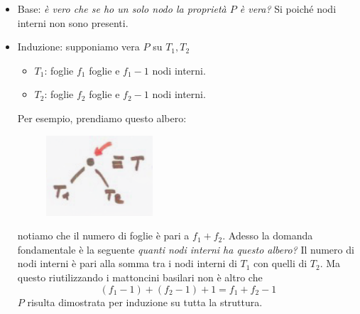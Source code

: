 \documentclass{article}
\begin{document}
\begin{itemize}
    \item Base: \textit{è vero che se ho un solo nodo la proprietà $P$ è vera?} Si poiché
          nodi interni non sono presenti.
    \item Induzione: supponiamo vera $P$ su $T_1,T_2$
          \begin{itemize}
              \item $T_1$: foglie $f_1$ foglie e $f_1-1$ nodi interni.
              \item $T_2$: foglie $f_2$ foglie e $f_2-1$ nodi interni.
          \end{itemize}

          Per esempio, prendiamo questo albero:
          \begin{figure}[H]
              \centering
              \includegraphics[scale=0.6]{images/BT_2.png}
          \end{figure}
          notiamo che il numero di foglie è pari a $f_1+f_2$. Adesso la domanda fondamentale è la seguente
          \textit{quanti nodi interni ha questo albero?} Il numero di nodi interni è pari alla somma tra i nodi
          interni di $T_1$ con quelli di $T_2$. Ma questo riutilizzando i mattoncini basilari non è altro che
          $$(f_1-1) + (f_2-1) + 1 = f_1 + f_2 -1$$
          $P$ risulta dimostrata per induzione su tutta la struttura.
\end{itemize}
\end{document}
